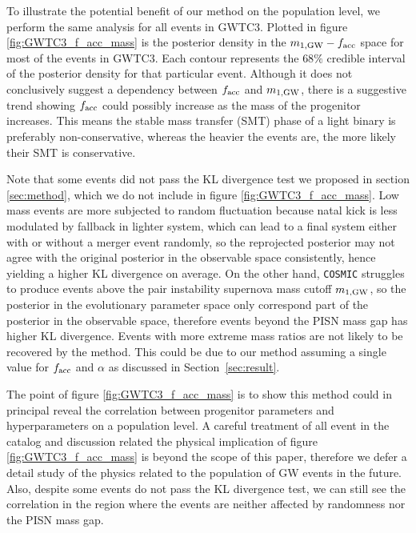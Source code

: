 \documentclass[twocolumn]{aastex631}
\begin{document}
To illustrate the potential benefit of our method on the population level, we perform the same analysis for all events in GWTC3.
Plotted in figure \ref{fig:GWTC3_f_acc_mass} is the posterior density in the $m_{1,{\rm GW}}-f_{\rm acc}$ space for most of the events in GWTC3.
Each contour represents the $68\%$ credible interval of the posterior density for that particular event.
Although it does not conclusively suggest a dependency between $f_{\rm acc}$ and $m_{1,{\rm GW}}$,
there is a suggestive trend showing $f_{\rm acc}$ could possibly increase as the mass of the progenitor increases.
This means the stable mass transfer (SMT) phase of a light binary is preferably non-conservative, whereas the heavier the events are, the more likely their SMT is conservative.

Note that some events did not pass the KL divergence test we proposed in section \ref{sec:method}, which we do not include in figure \ref{fig:GWTC3_f_acc_mass}.
Low mass events are more subjected to random fluctuation because natal kick is less modulated by fallback in lighter system,
which can lead to a final system either with or without a merger event randomly,
so the reprojected posterior may not agree with the original posterior in the observable space consistently, hence yielding a higher KL divergence on average.
On the other hand, \texttt{COSMIC} struggles to produce events above the pair instability supernova mass cutoff $m_{1,{\rm GW}}$,
so the posterior in the evolutionary parameter space only correspond part of the posterior in the observable space, therefore events beyond the PISN mass gap has higher KL divergence.
Events with more extreme mass ratios are not likely to be recovered by the method. This could be due to our method assuming a single value for $f_{\rm acc}$ and $\alpha$ as discussed 
in Section~\ref{sec:result}.

The point of figure \ref{fig:GWTC3_f_acc_mass} is to show this method could in principal reveal the correlation between progenitor parameters and hyperparameters on a population level.
A careful treatment of all event in the catalog and discussion related the physical implication of figure \ref{fig:GWTC3_f_acc_mass} is beyond the scope of this paper,
therefore we defer a detail study of the physics related to the population of GW events in the future.
Also, despite some events do not pass the KL divergence test, we can still see the correlation in the region where the events are neither affected by randomness nor the PISN mass gap.
\end{document}
